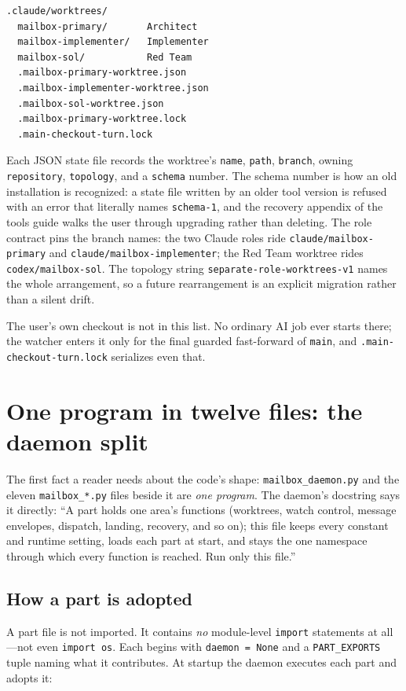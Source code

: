 \documentclass[10pt,aps,prd,twocolumn,nofootinbib]{revtex4-2}
\newcommand{\code}[1]{\texttt{#1}}
\newcommand{\file}[1]{\texttt{#1}}
\begin{document}
\begin{verbatim}
.claude/worktrees/
  mailbox-primary/       Architect
  mailbox-implementer/   Implementer
  mailbox-sol/           Red Team
  .mailbox-primary-worktree.json
  .mailbox-implementer-worktree.json
  .mailbox-sol-worktree.json
  .mailbox-primary-worktree.lock
  .main-checkout-turn.lock
\end{verbatim}

Each JSON state file records the worktree's \code{name}, \code{path},
\code{branch}, owning \code{repository}, \code{topology}, and a
\code{schema} number.  The schema number is how an old installation is
recognized: a state file written by an older tool version is refused
with an error that literally names \code{schema-1}, and the recovery
appendix of the tools guide walks the user through upgrading rather
than deleting.  The role contract pins the branch names: the two Claude
roles ride \code{claude/mailbox-primary} and
\code{claude/mailbox-implementer}; the Red Team worktree rides
\code{codex/mailbox-sol}.  The topology string
\code{separate-role-worktrees-v1} names the whole arrangement, so a
future rearrangement is an explicit migration rather than a silent
drift.

The user's own checkout is not in this list.  No ordinary AI job ever
starts there; the watcher enters it only for the final guarded
fast-forward of \code{main}, and \file{.main-checkout-turn.lock}
serializes even that.

\section{One program in twelve files: the daemon split}
\label{sec:daemon-split}

The first fact a reader needs about the code's shape:
\file{mailbox\_daemon.py} and the eleven \file{mailbox\_*.py} files
beside it are \emph{one program}.  The daemon's docstring says it
directly: ``A part holds one area's functions (worktrees, watch
control, message envelopes, dispatch, landing, recovery, and so on);
this file keeps every constant and runtime setting, loads each part at
start, and stays the one namespace through which every function is
reached.  Run only this file.''

\subsection{How a part is adopted}

A part file is not imported.  It contains \emph{no} module-level
\code{import} statements at all---not even \code{import os}.  Each
begins with \code{daemon = None} and a \code{PART\_EXPORTS} tuple
naming what it contributes.  At startup the daemon executes each part
and adopts it:
\end{document}
